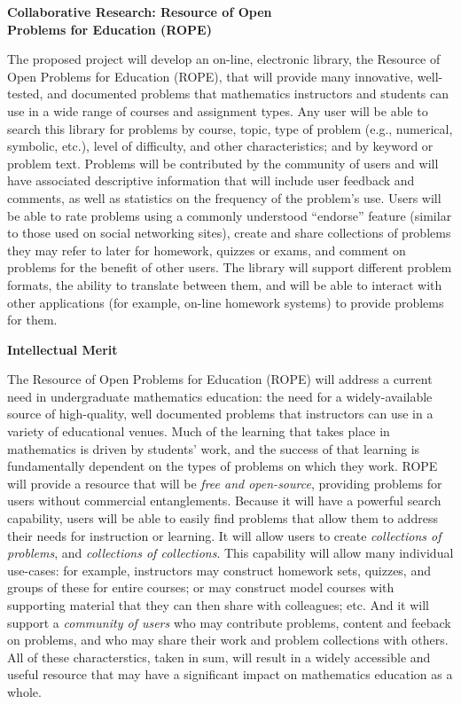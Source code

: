 \documentclass[11pt]{article}
\begin{document}
\begin{center}
{\Large \textbf{Collaborative Research: Resource of Open\\
Problems for Education (ROPE)}}
\end{center}

\bigskip
\noindent
The proposed project will develop an on-line, electronic library, the Resource of Open Problems for Education (ROPE), that will
provide many innovative, well-tested, and documented problems
that mathematics instructors and students can use in a wide range of courses and assignment types.  Any user will be able to search this
library for problems by course, topic, type of problem (e.g.,
numerical, symbolic, etc.), level of difficulty, and other
characteristics; and by keyword or problem text.  Problems will be contributed by the community of users
and will have associated descriptive information that will include user
feedback and comments, as well as statistics on the frequency of the
problem's use.  Users will be able to rate problems using a commonly
understood ``endorse'' feature (similar to those used on social networking
sites), create and share collections of problems they may refer to later
for homework, quizzes or exams, and comment on problems for the benefit of
other users.  The library will support different problem formats, the
ability to translate between them, and will be able to interact with other
applications (for example, on-line homework systems) to provide problems
for them.

\bigskip\bigskip
\noindent
{\large \textbf{Intellectual Merit}}

The Resource of Open Problems for Education (ROPE) will address a current need in
undergraduate mathematics education: the need for a widely-available
source of high-quality, well documented problems that instructors can use
in a variety of educational venues.  Much of the learning that takes place in mathematics
is driven by students' work, and the success of that learning is
fundamentally dependent on the types of problems on which they work.  ROPE
will provide a resource that will be \emph{free and open-source},
providing problems for users without commercial entanglements.  Because it
will have a powerful search capability, users will be able to easily find
problems that allow them to address their needs for instruction or
learning.  It will allow users to create \emph{collections of problems},
and \emph{collections of collections}.  This capability will allow many
individual use-cases: for example, instructors may construct homework
sets, quizzes, and groups of these for entire courses; or may construct
model courses with supporting material that they can then share with
colleagues; etc.  And it will support a \emph{community of users} who may
contribute problems, content and feeback on problems, and who may share
their work and problem collections with others.  All of these
characterstics, taken in sum, will result in a widely accessible and
useful resource that may have a significant impact on mathematics
education as a whole.
\end{document}

